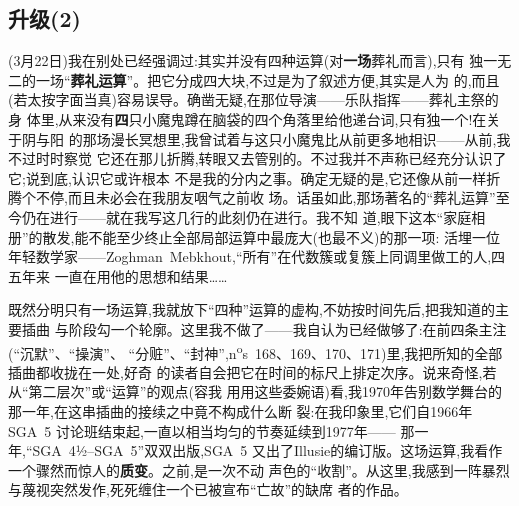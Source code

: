 \subsection{升级(2)}   %


\dmark{}(3月22日)我在别处已经强调过:其实并没有四种运算(对\textbf{一场}葬礼而言),只有
独一无二的一场“\textbf{葬礼运算}”。把它分成四大块,不过是为了叙述方便,其实是人为
的,而且(若太按字面当真)容易误导。确凿无疑,在那位导演——乐队指挥——葬礼主祭的身
体里,从来没有\textbf{四}只小魔鬼蹲在脑袋的四个角落里给他递台词,只有独一个!在关于阴与阳
的那场漫长冥想里,我曾试着与这只小魔鬼比从前更多地相识——从前,我不过时时察觉
它还在那儿折腾,转眼又去管别的。不过我并不声称已经充分认识了它;说到底,认识它或许根本
不是我的分内之事。确定无疑的是,它还像从前一样折腾个不停,而且未必会在我朋友咽气之前收
场。话虽如此,那场著名的“葬礼运算”至今仍在进行——就在我写这几行的此刻仍在进行。我不知
道,眼下这本“家庭相册”的散发,能不能至少终止全部局部运算中最庞大(也最不义)的那一项:
活埋一位年轻数学家——Zoghman~Mebkhout,“所有”在代数簇或复簇上同调里做工的人,四五年来
一直在用他的思想和结果……

既然分明只有一场运算,我就放下“四种”运算的虚构,不妨按时间先后,把我知道的主要插曲
与阶段勾一个轮廓。这里我不做了——我自认为已经做够了:在前四条主注(“沉默”、“操演”、
“分赃”、“封神”,n\textsuperscript{o}s~168、169、170、171)里,我把所知的全部插曲都收拢在一处,好奇
的读者自会把它在时间的标尺上排定次序。说来奇怪,若从“第二层次”或“运算”的观点(容我
用用这些委婉语)看,我1970年告别数学舞台的那一年,在这串插曲的接续之中竟不构成什么断
裂:在我印象里,它们自1966年 SGA~5 讨论班结束起,一直以相当均匀的节奏延续到1977年——
那一年,“SGA~4½--SGA~5”双双出版,SGA~5 又出了Illusie的\dmark{}编订版。这场运算,我看作一个骤然而惊人的\textbf{质变}。之前,是一次不动
声色的“收割”。从这里,我感到一阵暴烈与蔑视突然发作,死死缠住一个已被宣布“亡故”的缺席
者的作品。


